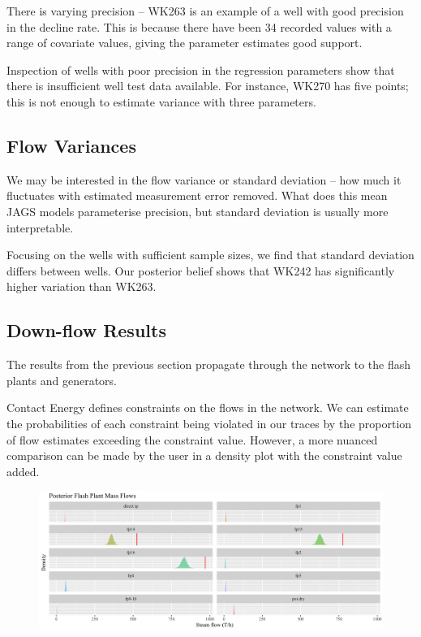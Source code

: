 \documentclass[a4paper, 12pt]{article}
\begin{document}
There is varying precision -- WK263 is an example of a well with good precision in the decline rate. This is because there have been 34 recorded values with a range of covariate values, giving the parameter estimates good support.

Inspection of wells with poor precision in the regression parameters show that there is insufficient well test data available. For instance, WK270 has five points; this is not enough to estimate variance with three parameters.

\subsection{Flow Variances}
We may be interested in the flow variance or standard deviation -- how much it fluctuates with estimated measurement error removed. What does this mean JAGS models parameterise precision, but standard deviation  is usually more interpretable.

Focusing on the wells with sufficient sample sizes, we find that standard deviation differs between wells. Our posterior belief shows that WK242 has significantly higher variation than WK263.

\subsection{Down-flow Results}
The results from the previous section propagate through the network to the flash plants and generators.

Contact Energy defines constraints on the flows in the network. We can estimate the probabilities of each constraint being violated in our traces by the proportion of flow estimates exceeding the constraint value. However, a more nuanced comparison can be made by the user in a density plot with the constraint value added.

\begin{figure}
\centering
  \includegraphics[width=\linewidth]{media/constraints}
  \label{fig:constraints}
\end{figure}
\end{document}
